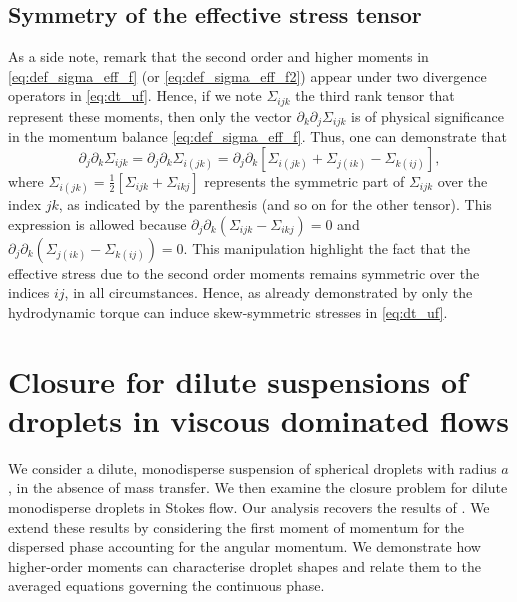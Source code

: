 \subsection{Symmetry of the effective stress tensor}
As a side note, remark that the second order and higher moments in \ref{eq:def_sigma_eff_f} (or \ref{eq:def_sigma_eff_f2}) appear under two divergence operators in \ref{eq:dt_uf}. 
Hence, if we note $\Sigma_{ijk}$ the third rank tensor that represent these moments, then only the vector $\partial_k \partial_j\Sigma_{ijk}$ is of physical significance in the momentum balance \eqref{eq:def_sigma_eff_f}.
Thus, one can demonstrate that \citep{lhuillier1996contribution}
\begin{equation}
    \partial_j \partial_k \Sigma_{ijk}
    = \partial_j \partial_k \Sigma_{i(jk)}
    =
    \partial_j \partial_k \left[
        \Sigma_{i(jk)}
        + \Sigma_{j(ik)}
        - \Sigma_{k(ij)}
    \right],
    \label{eq:sym_proof}
\end{equation}
where $\Sigma_{i(jk)} = \frac{1}{2}[\Sigma_{ijk} + \Sigma_{ikj}]$ represents the symmetric part of $\Sigma_{ijk}$ over the index $jk$, as indicated by the parenthesis (and so on for the other tensor). 
This expression is allowed because $\partial_j \partial_k (\Sigma_{ijk} - \Sigma_{ikj}) = 0$ and $\partial_j \partial_k (\Sigma_{j(ik)} - \Sigma_{k(ij)}) = 0$. 
This manipulation highlight the fact that the effective stress due to the second order moments remains symmetric over the indices $ij$, in all circumstances.
Hence, as already demonstrated by \citet{lhuillier1996contribution} only the hydrodynamic torque can induce skew-symmetric stresses in \ref{eq:dt_uf}. 




\section{Closure for dilute suspensions of droplets in viscous dominated flows}
We consider a dilute, monodisperse suspension of spherical droplets with radius \( a \), in the absence of mass transfer. 
We then examine the closure problem for dilute monodisperse droplets in Stokes flow. 
Our analysis recovers the results of \citet[Appendix B]{zhang1997momentum}. 
We extend these results by considering the first moment of momentum for the dispersed phase accounting for the angular momentum. 
We demonstrate how higher-order moments can characterise droplet shapes and relate them to the averaged equations governing the continuous phase. 
